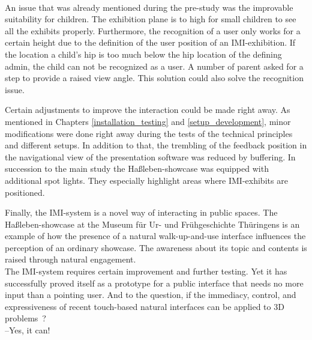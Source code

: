 \\
An issue that was already mentioned during the pre-study was the improvable suitability for children. The exhibition plane is to high for small children to see all the exhibits properly. Furthermore, the recognition of a user only works for a certain height due to the definition of the user position of an \ac{IMI}-exhibition. If the location a child's hip is too much below the hip location of the defining admin, the child can not be recognized as a user. A number of parent asked for a step to provide a raised view angle. This solution could also solve the recognition issue.

Certain adjustments to improve the interaction could be made right away. As mentioned in Chapters \ref{installation_testing} and \ref{setup_development}, minor modifications were done right away during the tests of the technical principles and different setups. In addition to that, the trembling of the feedback position in the navigational view of the presentation software was reduced by buffering. In succession to the main study the Haßleben-showcase was equipped with additional spot lights. They especially highlight areas where \ac{IMI}-exhibits are positioned.   

Finally, the \ac{IMI}-system is a novel way of interacting in public spaces. The Haßleben-showcase at the Museum für Ur- und Frühgeschichte Thüringens is an example of how the presence of a natural walk-up-and-use interface influences the perception of an ordinary showcase. The awareness about its topic and contents is raised through natural engagement. 
\\
The \ac{IMI}-system requires certain improvement and further testing. Yet it has successfully proved itself as a prototype for a public interface that needs no more input than a pointing user. And to the question, if the immediacy, control, and expressiveness of recent touch-based natural interfaces can be applied to 3D problems~\cite{ForewordCnG}?\\
--Yes, it can!

%
